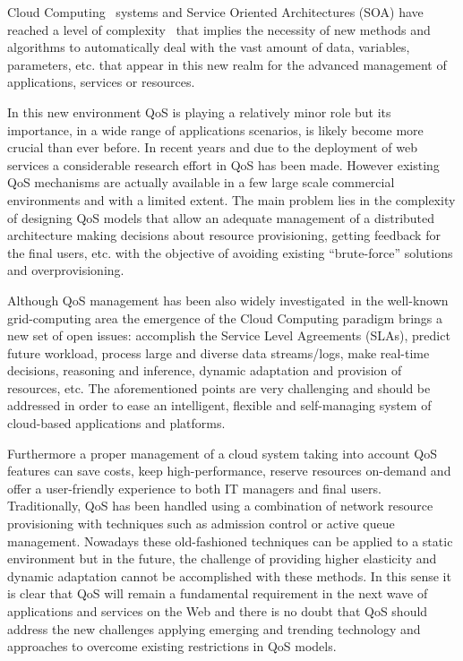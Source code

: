 Cloud Computing~\cite{mell2011nist} systems and Service Oriented Architectures (SOA) have 
reached a level of complexity~\cite{Huebscher:2008:SAC:1380584.1380585,Conejero:2012:MSQ:2357487.2357591} that implies the necessity of new methods 
and algorithms to automatically deal with the vast amount of data, variables, 
parameters, etc. that appear in this new realm for the advanced management of 
applications, services or resources. 

In this new environment QoS is playing a relatively minor role but its 
importance, in a wide range of applications scenarios, is likely become more 
crucial than ever before. In recent years and due to the deployment of web 
services a considerable research effort in QoS has been made. However existing 
QoS mechanisms are actually available in a few large scale commercial 
environments and with a limited extent. The main problem lies in the complexity 
of designing QoS models that allow an adequate management of a distributed 
architecture making decisions about resource provisioning, getting feedback for 
the final users, etc. with the objective of avoiding existing “brute-force” 
solutions and overprovisioning. 

Although QoS management has been also widely investigated~\cite{Conejero:2012:MSQ:2357487.2357591}in the well-known 
grid-computing area the emergence of the Cloud Computing paradigm brings a new 
set of open issues: accomplish the  Service Level Agreements (SLAs), predict 
future workload, process large and diverse data streams/logs, make real-time 
decisions, reasoning and inference, dynamic adaptation and provision of 
resources, etc. The aforementioned points are very challenging and should be 
addressed in order to ease an intelligent, flexible and self-managing system of 
cloud-based applications and platforms.

Furthermore a proper management of a cloud system taking into account QoS 
features can save costs, keep high-performance, reserve resources on-demand and 
offer a user-friendly experience to both IT managers and final users. 
Traditionally, QoS has been handled using a combination of network resource 
provisioning with techniques such as admission control or active queue 
management. Nowadays these old-fashioned techniques can be applied to a static 
environment but in the future, the challenge of providing higher elasticity and 
dynamic adaptation cannot be accomplished with these methods. In this sense it 
is clear that QoS will remain a fundamental requirement in the next wave of 
applications and services on the Web and there is no doubt that QoS should 
address the new challenges applying emerging and trending technology and 
approaches to overcome existing restrictions in QoS models.


